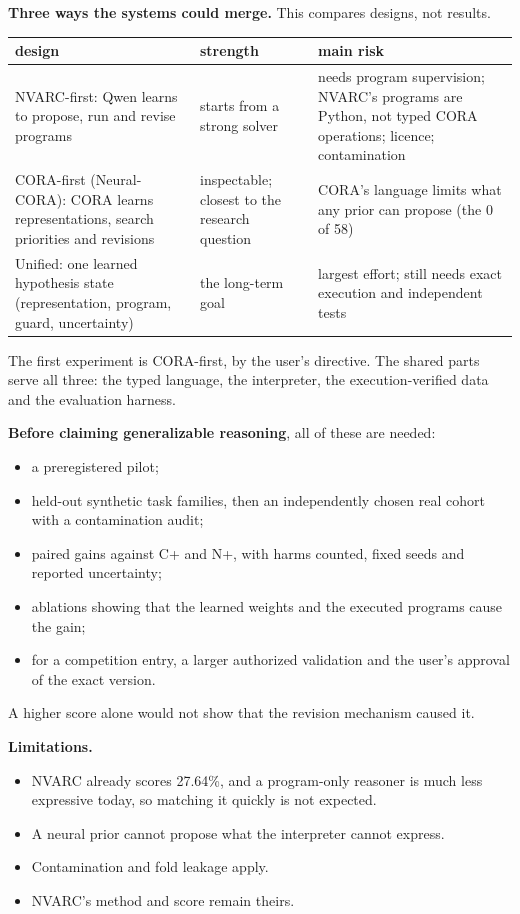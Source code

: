\documentclass[11pt]{article}
\begin{document}
\textbf{Three ways the systems could merge.} This compares designs, not results.
\begin{center}
\begin{tabular}{@{}p{5.0cm}p{3.6cm}p{7.2cm}@{}}
\toprule
design & strength & main risk \\ \midrule
NVARC-first: Qwen learns to propose, run and revise programs & starts from a strong solver & needs program
supervision; NVARC's programs are Python, not typed CORA operations; licence; contamination \\
CORA-first (Neural-CORA): CORA learns representations, search priorities and revisions & inspectable; closest to the
research question & CORA's language limits what any prior can propose (the 0 of 58) \\
Unified: one learned hypothesis state (representation, program, guard, uncertainty) & the long-term goal & largest
effort; still needs exact execution and independent tests \\ \bottomrule
\end{tabular}
\end{center}
The first experiment is CORA-first, by the user's directive. The shared parts serve all three: the typed language, the
interpreter, the execution-verified data and the evaluation harness.

\textbf{Before claiming generalizable reasoning}, all of these are needed:
\begin{itemize}
  \item a preregistered pilot;
  \item held-out synthetic task families, then an independently chosen real cohort with a contamination audit;
  \item paired gains against C+ and N+, with harms counted, fixed seeds and reported uncertainty;
  \item ablations showing that the learned weights and the executed programs cause the gain;
  \item for a competition entry, a larger authorized validation and the user's approval of the exact version.
\end{itemize}
A higher score alone would not show that the revision mechanism caused it.

\textbf{Limitations.}
\begin{itemize}
  \item NVARC already scores 27.64\%, and a program-only reasoner is much less expressive today, so matching it
        quickly is not expected.
  \item A neural prior cannot propose what the interpreter cannot express.
  \item Contamination and fold leakage apply.
  \item NVARC's method and score remain theirs.
\end{itemize}
\end{document}
